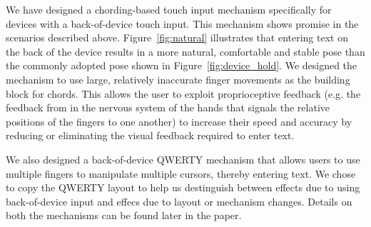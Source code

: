 We have designed a chording-based touch input mechanism specifically
for devices with a back-of-device touch input.  This mechanism shows
promise in the scenarios described above.  Figure~\ref{fig:natural}
illustrates that entering text on the back of the device results in a
more natural, comfortable and stable pose than the commonly adopted
pose shown in Figure~\ref{fig:device_hold}.  We designed the mechanism
to use large, relatively inaccurate finger movements as the building
block for chords.  This allows the user to exploit proprioceptive
feedback (e.g. the feedback from in the nervous system of the hands
that signals the relative positions of the fingers to one another) to
increase their speed and accuracy by reducing or eliminating the
visual feedback required to enter text. 

We also designed a back-of-device QWERTY mechanism that allows users
to use multiple fingers to manipulate multiple cursors, thereby
entering text. We chose to copy the QWERTY layout to help us
destinguish between effects due to using back-of-device input and
effecs due to layout or mechanism changes. Details on both the
mechanisms can be found later in the paper.

